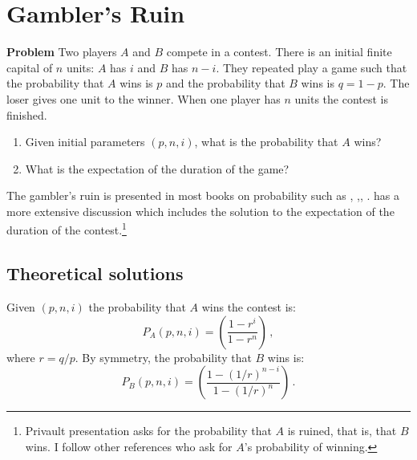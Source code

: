 
\section{Gambler's Ruin}\label{s.gamblers}

\textbf{Problem} Two players $A$ and $B$ compete in a contest. There is an initial finite capital of $n$ units: $A$ has $i$ and $B$ has $n-i$. They repeated play a game such that the probability that $A$ wins is $p$ and the probability that $B$ wins is $q=1-p$. The loser gives one unit to the winner. When one player has $n$ units the contest is finished.
\begin{enumerate}
\item Given initial parameters $(p, n, i)$, what is the probability that $A$ wins?
\item What is the expectation of the duration of the game?
\end{enumerate}
\begin{center}
\end{center}
The gambler's ruin is presented in most books on probability such as \cite[Section~2.7.2]{BW}, \cite[Section~3.4]{ross},\cite{mosteller}, \cite{mos}. \cite[Chapter~2]{privault} has a more extensive discussion which includes the solution to the expectation of the duration of the contest.\footnote{Privault presentation asks for the probability that $A$ is ruined, that is, that $B$ wins. I follow other references who ask for $A$'s probability of winning.}

\subsection{Theoretical solutions}

Given $(p,n,i)$ the probability that $A$ wins the contest is:
\[
P_A(p, n, i) = \left(\frac{1-r^{i}}{1-r^n}\right)\,,
\]
where $r=q/p$. By symmetry, the probability that $B$ wins is:
\[
P_B(p, n, i) = \left(\frac{1-(1/r)^{n-i}}{1-(1/r)^{n}}\right)\,.
\]

